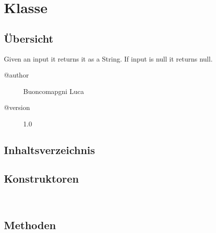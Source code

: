 
\section[AsString]{Klasse }\label{ontologyFramework.OFEventManagement.OFEventParameter.AsString-class}
\subsection{Übersicht}
Given an input it returns it as a String. If input is null it returns null.
\begin{description}
\item[@author] 
Buoncomapgni Luca
\item[@version] 
1.0
\end{description}
\subsection{Inhaltsverzeichnis}
\subsection{Konstruktoren}
\begin{description}
\item[{\label{ontologyFramework.OFEventManagement.OFEventParameter.AsString()}}]
~ 
\end{description}
\subsection{Methoden}
\begin{description}
\item[{\label{ontologyFramework.OFEventManagement.OFEventParameter.AsString.getParameter(java.lang.Object,ontologyFramework.OFContextManagement.OWLReferences)}}]
~ 
\end{description}
